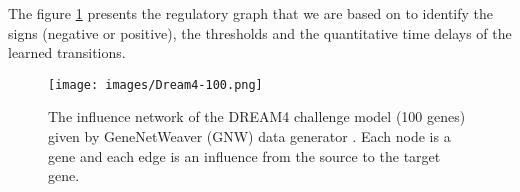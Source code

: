 \documentclass[runningheads,a4paper]{llncs}
\begin{document}
The figure \ref{fig:influence-graph-DREAM4} presents the regulatory graph that we are based on to identify the signs (negative or positive), the thresholds and the quantitative time delays of the learned transitions.
    \begin{figure}[h]\centering
\texttt{[image: images/Dream4-100.png]}
\caption{The influence network of the DREAM4 challenge model (100 genes) given by GeneNetWeaver (GNW) data generator \cite{schaffter2011genenetweaver}. Each node is a gene and each edge is an influence from the source to the target gene.}
\label{fig:influence-graph-DREAM4}
\end{figure}
\end{document}
